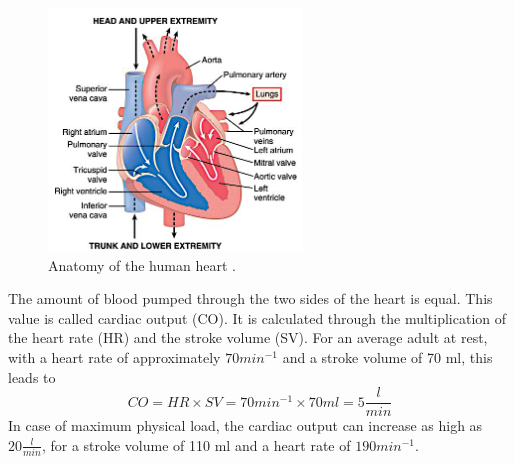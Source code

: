  \begin{figure}[h]
   \centering
   \includegraphics[width=0.6\textwidth]{images/heart_1.jpg}
   \caption{Anatomy of the human heart \cite{GH20}.}
   \label{fig:heart_anat}
 \end{figure}
 The amount of blood pumped through the two sides of the heart is equal. This value is called cardiac output (CO). It is calculated through the multiplication of the heart rate (HR) and the stroke volume (SV). For an average adult at rest, with a heart rate of approximately $70 min^{-1}$ and a stroke volume of 70 ml, this leads to
 \begin{equation}
   CO = HR \times SV = 70 min^{-1} \times 70ml = 5 \frac{l}{min}
  \label{eq:CO}
 \end{equation}
In case of maximum physical load, the cardiac output can increase as high as $20\frac{l}{min}$, for a stroke volume of 110 ml and a heart rate of $190 min^{-1}$. \cite{HKS4}

